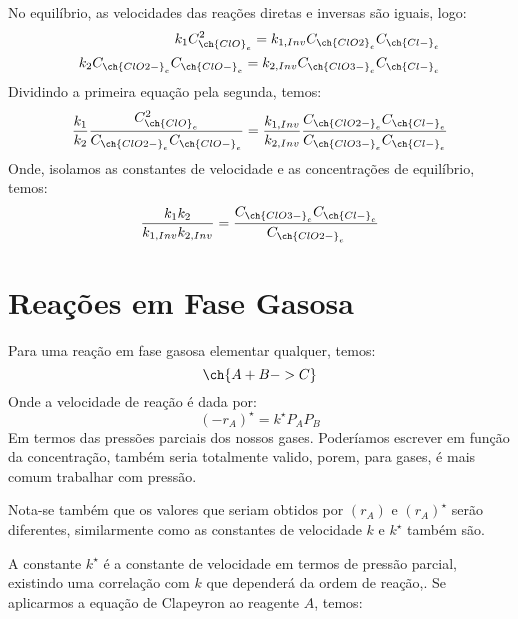No equilíbrio, as velocidades das reações diretas e inversas são iguais, logo:
\begin{align*}
    k_1 C_{\ch{ClO}_{e}}^{2} = k_{1,Inv} C_{\ch{ClO2}_{e}} C_{\ch{Cl-}_{e}} \\
    k_2 C_{\ch{ClO2-}_{e}}C_{\ch{ClO-}_{e}} = k_{2,Inv} C_{\ch{ClO3-}_{e}} C_{\ch{Cl-}_{e}}
\end{align*}
Dividindo a primeira equação pela segunda, temos:
\begin{equation}
    \frac{k_1}{k_2} \frac{C_{\ch{ClO}_{e}}^{2}}{C_{\ch{ClO2-}_{e}}C_{\ch{ClO-}_{e}}} = \frac{k_{1,Inv}}{k_{2,Inv}} \frac{C_{\ch{ClO2-}_{e}} C_{\ch{Cl-}_{e}}}{C_{\ch{ClO3-}_{e}} C_{\ch{Cl-}_{e}}}
\end{equation}
Onde, isolamos as constantes de velocidade e as concentrações de equilíbrio, temos:
\begin{equation}
    \frac{k_1 k_2}{k_{1,Inv} k_{2,Inv}} = \frac{C_{\ch{ClO3-}_{e}}C_{\ch{Cl-}_{e}}}{C_{\ch{ClO2-}_{e}}}
\end{equation}
\section{Reações em Fase Gasosa}
Para uma reação em fase gasosa elementar qualquer, temos:
\begin{equation}
    \ch{A + B -> C}
\end{equation}
Onde a velocidade de reação é dada por:
\begin{equation}
    \left( -r_A \right)^{\star} =k^{\star} P_A P_B
\end{equation}
Em termos das pressões parciais dos nossos gases. Poderíamos escrever em função da concentração,
também seria totalmente valido, porem, para gases, é mais comum trabalhar com pressão. \par

Nota-se também que os valores que seriam obtidos por \(\left( r_A \right) \) e \(\left( r_A
\right)^{\star} \) serão diferentes, similarmente como as constantes de velocidade \(k\) e
\(k^{\star} \) também são. \par

A constante \(k^{\star} \) é a constante de velocidade em termos de pressão parcial, existindo uma
correlação com \(k\) que dependerá da ordem de reação,. Se aplicarmos a equação de Clapeyron ao
reagente \(A\), temos:

